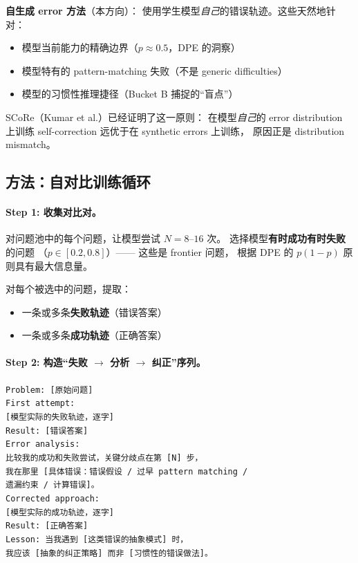\documentclass[12pt,a4paper]{article}
\begin{document}
\textbf{自生成 error 方法}（本方向）：
使用学生模型\textit{自己}的错误轨迹。这些天然地针对：
\begin{itemize}[leftmargin=2em]
  \item 模型当前能力的精确边界（$p \approx 0.5$，DPE 的洞察）
  \item 模型特有的 pattern-matching 失败（不是 generic difficulties）
  \item 模型的习惯性推理捷径（Bucket B 捕捉的``盲点''）
\end{itemize}

\noindent
SCoRe（Kumar et al.）已经证明了这一原则：
在模型\textit{自己}的 error distribution 上训练 self-correction
远优于在 synthetic errors 上训练，
原因正是 distribution mismatch。

\subsection{方法：自对比训练循环}

\paragraph{Step 1: 收集对比对。}
对问题池中的每个问题，让模型尝试 $N = 8\text{--}16$ 次。
选择模型\textbf{有时成功有时失败}的问题
（$p \in [0.2, 0.8]$）——
这些是 frontier 问题，
根据 DPE 的 $p(1-p)$ 原则具有最大信息量。

对每个被选中的问题，提取：
\begin{itemize}[leftmargin=2em]
  \item 一条或多条\textbf{失败轨迹}（错误答案）
  \item 一条或多条\textbf{成功轨迹}（正确答案）
\end{itemize}

\paragraph{Step 2: 构造``失败 $\rightarrow$ 分析 $\rightarrow$ 纠正''序列。}

\begin{tcolorbox}[colback=gray!5,colframe=gray!50,boxrule=0.3pt,left=4pt,right=4pt]
\small
\texttt{Problem: [原始问题]}\\[3pt]
\texttt{First attempt:}\\
\texttt{[模型实际的失败轨迹，逐字]}\\
\texttt{Result: [错误答案]}\\[3pt]
\texttt{Error analysis:}\\
\texttt{比较我的成功和失败尝试，关键分歧点在第 [N] 步，}\\
\texttt{我在那里 [具体错误：错误假设 / 过早 pattern matching / }\\
\texttt{遗漏约束 / 计算错误]。}\\[3pt]
\texttt{Corrected approach:}\\
\texttt{[模型实际的成功轨迹，逐字]}\\
\texttt{Result: [正确答案]}\\[3pt]
\texttt{Lesson: 当我遇到 [这类错误的抽象模式] 时，}\\
\texttt{我应该 [抽象的纠正策略] 而非 [习惯性的错误做法]。}
\end{tcolorbox}
\end{document}
